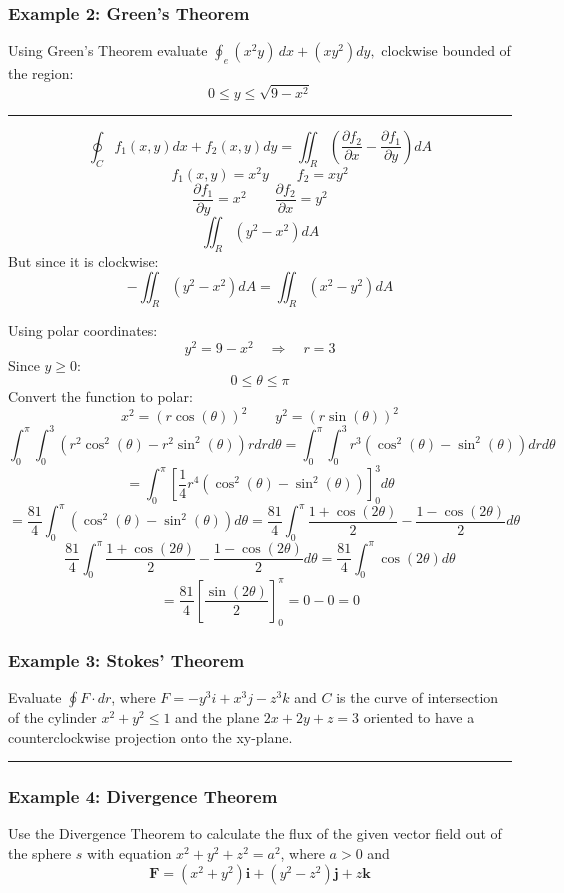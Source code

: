\subsubsection{Example 2: Green's Theorem}
Using Green's Theorem evaluate $\oint_{e}(x^{2}y)\,d x+(x y^{2})d y,$ clockwise bounded of the region:
$$0\leq y\leq{\sqrt{9-x^{2}}}$$

\rule{\textwidth}{0.5pt}

$$\oint_{ C } f_1(x, y) d x+f_2(x, y) d y=\iint_{ R }\left(\frac{\partial f_2}{\partial x}-\frac{\partial f_1}{\partial y}\right) d A$$
$$f_1(x,y)=x^2y\qquad f_2=xy^2$$
$$\frac{\partial f_1}{\partial y}=x^2 \qquad \frac{\partial f_2}{\partial x}=y^2$$
$$\iint_{ R }\left(y^2-x^2\right) d A$$
But since it is clockwise:
$$-\iint_{ R }\left(y^2-x^2\right) d A=\iint_{ R }\left(x^2-y^2\right) d A$$

Using polar coordinates:
$$y^2=9-x^2\quad\Rightarrow\quad r=3$$
Since $y\geq 0$:
$$0\leq\theta\leq\pi$$
Convert the function to polar:
$$x^2=(r\cos(\theta))^2\qquad y^2=(r\sin(\theta))^2$$
$$\int_0^\pi\int_0^3(r^2\cos^2(\theta)-r^2\sin^2(\theta))rdrd\theta =\int_0^\pi\int_0^3r^3(\cos^2(\theta)-\sin^2(\theta))drd\theta$$
$$=\int_0^\pi\left[\frac{1}{4}r^4(\cos^2(\theta)-\sin^2(\theta))\right]_0^3d\theta$$
$$=\frac{81}{4}\int_0^\pi(\cos^2(\theta)-\sin^2(\theta))d\theta=\frac{81}{4}\int_0^\pi\frac{1+\cos(2\theta)}{2}-\frac{1-\cos(2\theta)}{2} d\theta$$
$$\frac{81}{4}\int_0^\pi\frac{1+\cos(2\theta)}{2}-\frac{1-\cos(2\theta)}{2} d\theta=\frac{81}{4}\int_0^\pi \cos(2\theta) d\theta$$
$$=\frac{81}{4}\left[\frac{\sin(2\theta)}{2}\right]_0^\pi=0-0=0$$


\subsubsection{Example 3: Stokes' Theorem}
Evaluate $\oint F\cdot dr$, where $F=-y^3i+x^3j-z^3k$ and $C$ is the curve of intersection of the cylinder
$x^2+y^2\leq 1$ and the plane $2x+2y+z=3$ oriented to have a counterclockwise projection onto the xy-plane.

\rule{\textwidth}{0.5pt}

\subsubsection{Example 4: Divergence Theorem}
Use the Divergence Theorem to calculate the flux of the given vector field out
of the sphere $s$ with equation $x^2 + y^2 + z^2 = a^2$, where $a > 0$ and
$$\mathbf{F}=(x^{2}+y^{2})\mathbf{i}+(y^{2}-z^{2})\mathbf{j}+z\mathbf{k}$$
